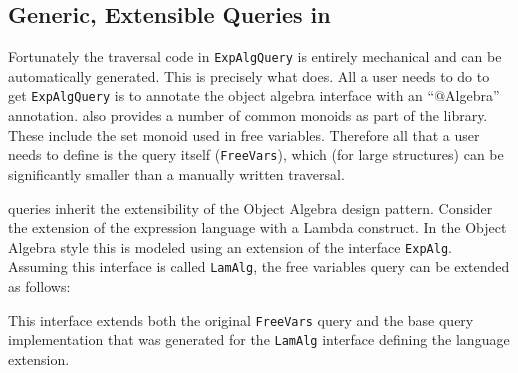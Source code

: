 \subsection{Generic, Extensible Queries in \name}

Fortunately the traversal code in \lstinline{ExpAlgQuery} is entirely
mechanical and can be automatically generated.  This is precisely what
\name does. All a user needs to do to get \lstinline{ExpAlgQuery} is
to annotate the object algebra interface with an ``$@$Algebra''
annotation. \name also provides a number of common monoids as part of
the library. These include the set monoid used in free variables.
Therefore all that a user needs to define is the query itself
(\lstinline{FreeVars}), which (for large structures) can be
significantly smaller than a manually written traversal.

\name queries inherit the extensibility of the Object Algebra design pattern.
Consider the extension of the expression language with a Lambda construct.
In the Object Algebra style this is modeled using an extension of the interface \lstinline{ExpAlg}.
Assuming this interface is called \lstinline{LamAlg}, the free variables query can be extended as follows:


This interface extends both the original \lstinline{FreeVars} query and the base query implementation that was generated for the \lstinline{LamAlg} interface defining the language extension. 
